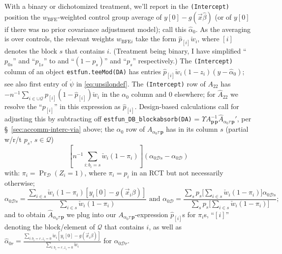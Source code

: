 \documentclass{article}
\newcommand{\owt}[1][{[z_{i}]}]{\ensuremath{\check{w}_{i#1}}}
\newcommand{\AbsorbInterceptsEF}{\Upsilon}
\begin{document}
With a binary or dichotomized treatment, we'll report in the
\texttt{(Intercept)} position the $w_{\text{BFE}}$-weighted
control group average of $y[0] - g(\vec{x}\hat\beta)$ (or of $y[0]$ if
there was no prior covariance adjustment model); call this $\hat{\alpha}_{0}$. As the
averaging is over controls, the relevant weights $w_{\text{BFE}i}$ take
the form $\hat{p}_{[i]} \owt[]$, where $[i]$ denotes the block $s$
that contains $i$.  (Treatment being
binary, I have simplified `` $p_{0s}$'' and ``$p_{1s}$'' to 
and ``$(1-p_{s})$'' and ``$p_{s}$'' respectively.)  The
\texttt{(Intercept)} column of an object \texttt{estfun.teeMod(DA)} has entries
$\hat{p}_{[i]}\owt[](1-z_{i})(y - \hat{\alpha}_{0})$; see also first
entry of $\acute{\psi}$ in \eqref{eq:upsilondef}. The
\texttt{(Intercept)} row of $A_{22}$ has $-n^{-1}\sum_{i \in \cup \mathcal{Q}}
p_{[i]}(1-\hat{p}_{[i]})\owt[]$ in the
$\alpha_{0}$ column and 0 elsewhere; for $\hat{A}_{22}$ we resolve the
``$p_{[i]}$'' in this expression as $\hat{p}_{[i]}$.  Design-based
calculations call for adjusting this by subtracting off
\texttt{estfun\_DB\_blockabsorb(DA)} = $\AbsorbInterceptsEF{}
  A_{\mathbf{p}\,\mathbf{p}}^{-1}\hat{A}_{\alpha_{0}\tau\,\mathbf{p}}'$, per \S~\ref{sec:accomm-interc-via}
  above; the $\alpha_{0}$ row of $A_{\alpha_{0}\tau\,\mathbf{p}}$ has in
  its column $s$ (partial w/r/t $p_{s}$, $s \in \mathcal{Q}$)
  \begin{equation*}
  \left[n^{-1}\sum_{i: b_{i}=s}\owt[](1-\pi_{i})\right](\alpha_{0\mathcal{D}s} - \alpha_{0\mathcal{D}})
  \end{equation*}
  with: $\pi_{i} = \operatorname{Pr}_{\mathcal{D}}(Z_{i}=1)$, where
  $\pi_{i} = p_{i}$ in an RCT but not necessarily otherwise;
  \begin{equation*}
 \alpha_{0\mathcal{D}s}=
  \frac{\sum_{i \in s}\owt[](1-\pi_{i})[y_{i}[0] -
    g(\vec{x}_{i}\beta)]}{\sum_{i \in s}\owt[](1-\pi_{i})}
  \text{ and }
  \alpha_{0\mathcal{D}} = \frac{\sum_{s}p_{s}\big[\sum_{i \in
      s}\owt[](1-\pi_{i})\big]
    \alpha_{0\mathcal{D}s}}{\sum_{s}p_{s}\big[\sum_{i \in s}\owt[](1-\pi_{i})\big]};
  \end{equation*}
  and to obtain $\hat{A}_{\alpha_{0}\tau\,\mathbf{p}}$ we plug into our
  ${A}_{\alpha_{0}\tau\,\mathbf{p}}$-expression $\hat{p}_{[i]}$s for
  $\pi_{i}$s, ``$[i]$'' denoting the block/element of $\mathcal{Q}$
  that contains $i$, as well as  $\hat{\alpha}_{0 r}=
  \frac{\sum_{i: b_{i}=r, z_{i}=0}\owt[][y_{i}[0] -
    g(\vec{x}_{i}\beta)]}{\sum_{i:b_{i}=r, z_{i}=0}\owt[]}$ for $\alpha_{0\mathcal{D}r}$.
\end{document}
